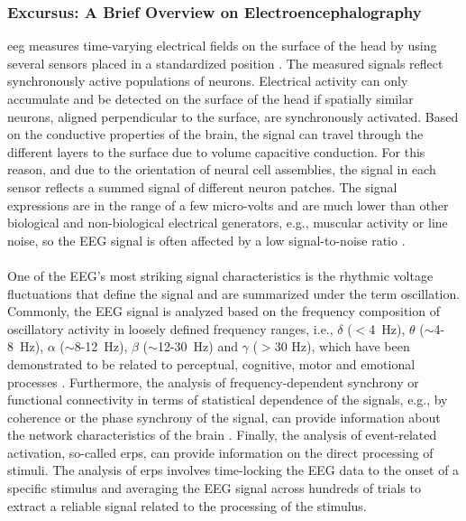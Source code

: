 \begin{tcolorbox}
    \subsubsection{Excursus: A Brief Overview on Electroencephalography}
    \Gls{eeg} measures time-varying electrical fields on the surface of the head by using several sensors placed in a standardized position \cite{Jackson2014}. The measured signals reflect synchronously active populations of neurons. Electrical activity can only accumulate and be detected on the surface of the head if spatially similar neurons, aligned perpendicular to the surface, are synchronously activated. Based on the conductive properties of the brain, the signal can travel through the different layers to the surface due to volume capacitive conduction. For this reason, and due to the orientation of neural cell assemblies, the signal in each sensor reflects a summed signal of different neuron patches. The signal expressions are in the range of a few micro-volts and are much lower than other biological and non-biological electrical generators, e.g., muscular activity or line noise, so the EEG signal is often affected by a low signal-to-noise ratio \cite{CohenX2017}.\\
    \\
    \noindent One of the EEG's most striking signal characteristics is the rhythmic voltage fluctuations that define the signal and are summarized under the term oscillation. Commonly, the EEG signal is analyzed based on the frequency composition of oscillatory activity in loosely defined frequency ranges, i.e., $\delta$ ($<$4~Hz), $\theta$ ($\sim$4-8~Hz), $\alpha$ ($\sim$8-12~Hz), $\beta$ ($\sim$12-30~Hz) and $\gamma$ ($>$30 Hz), which have been demonstrated to be related to perceptual, cognitive, motor and emotional processes \cite{CohenX2017}. Furthermore, the analysis of frequency-dependent synchrony or functional connectivity in terms of statistical dependence of the signals, e.g., by coherence or the phase synchrony of the signal, can provide information about the network characteristics of the brain \cite{Siegel2012}. Finally, the analysis of event-related activation, so-called \glspl{erp}, can provide information on the direct processing of stimuli. The analysis of \glspl{erp} involves time-locking the EEG data to the onset of a specific stimulus and averaging the EEG signal across hundreds of trials to extract a reliable signal related to the processing of the stimulus.
\end{tcolorbox}

